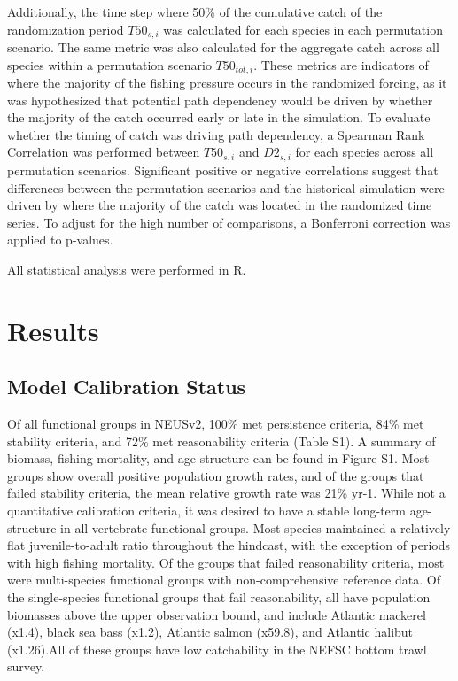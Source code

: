 \documentclass[
]{article}
\begin{document}
Additionally, the time step where 50\% of the cumulative catch of the randomization period \(T50_{s,i}\) was calculated for each species in each permutation scenario. The same metric was also calculated for the aggregate catch across all species within a permutation scenario \(T50_{tot,i}\). These metrics are indicators of where the majority of the fishing pressure occurs in the randomized forcing, as it was hypothesized that potential path dependency would be driven by whether the majority of the catch occurred early or late in the simulation. To evaluate whether the timing of catch was driving path dependency, a Spearman Rank Correlation was performed between \(T50_{s,i}\) and \(D2_{s,i}\) for each species across all permutation scenarios. Significant positive or negative correlations suggest that differences between the permutation scenarios and the historical simulation were driven by where the majority of the catch was located in the randomized time series. To adjust for the high number of comparisons, a Bonferroni correction was applied to p-values.

All statistical analysis were performed in R.

\section{Results}\label{results}

\subsection{Model Calibration Status}\label{model-calibration-status}

Of all functional groups in NEUSv2, 100\% met persistence criteria, 84\% met stability criteria, and 72\% met reasonability criteria (Table S1). A summary of biomass, fishing mortality, and age structure can be found in Figure S1. Most groups show overall positive population growth rates, and of the groups that failed stability criteria, the mean relative growth rate was 21\% yr-1. While not a quantitative calibration criteria, it was desired to have a stable long-term age-structure in all vertebrate functional groups. Most species maintained a relatively flat juvenile-to-adult ratio throughout the hindcast, with the exception of periods with high fishing mortality. Of the groups that failed reasonability criteria, most were multi-species functional groups with non-comprehensive reference data. Of the single-species functional groups that fail reasonability, all have population biomasses above the upper observation bound, and include Atlantic mackerel (x1.4), black sea bass (x1.2), Atlantic salmon (x59.8), and Atlantic halibut (x1.26).All of these groups have low catchability in the NEFSC bottom trawl survey.
\end{document}
